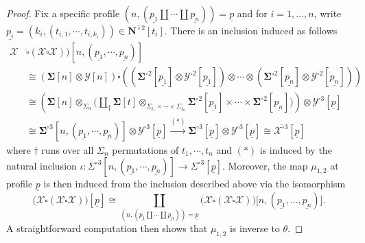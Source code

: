 \documentclass[11pt]{amsart}
\theoremstyle{definition}
\theoremstyle{remark}
\newcommand{\Cal}[1]{\mathcal{#1}}
\newcommand{\Ncirc}[1]{\mathbf{N}^{\hat{\circ}#1}}
\newcommand{\boxcirc}{\mathring{\square}}
\begin{document}
\begin{proof}
    Fix a specific profile $(n,(\underline{p_1}\amalg \cdots \amalg \underline{p_n}))=\underline{p}$ and for $i=1,\dots,n$, write $\underline{p_i}=(k_i, (t_{i,1},\cdots, t_{i,k_i})) \in \Ncirc{2}[t_i]$. There is an inclusion induced as follows \begin{align} 
         \Cal{X} &\boxcirc (\Cal{X} \boxcirc \Cal{X}) ) [n, (\underline{p_1},\cdots,\underline{p_n})] 
         \\
        & \cong (\mathbf{\Sigma}[n] \otimes  \Cal{Y}[n]) \square \left( \left( \mathbf{\Sigma}^{\circ 2}[\underline{p_1}] \otimes \Cal{Y}^{\square 2}[\underline{p_1}]\right)  \otimes \cdots \otimes \left( \mathbf{\Sigma}^{\circ 2}[\underline{p_n}] \otimes \Cal{Y}^{\square 2}[\underline{p_n}]\right) \right) \nonumber
        \\
        & \cong \left(\mathbf{\Sigma}[n] \otimes_{\Sigma_n} \Big(\coprod_{\dagger}\mathbf{\Sigma}[t] \otimes_{\Sigma_{t_1} \times \cdots \times \Sigma_{t_n}} \mathbf{\Sigma}^{\circ 2}[\underline{p_1}] \times \cdots \times \mathbf{\Sigma}^{\circ 2}[\underline{p_n}] \Big) \right) \otimes \Cal{Y}^{\square 3}[\underline{p}] \nonumber 
        \\ 
        & \cong \mathbf{\Sigma}^{\circ 3} [n, (\underline{p_1},\cdots, \underline{p_n})] \otimes \Cal{Y}^{\square 3}[\underline{p}] \xrightarrow{(*)} \mathbf{\Sigma}^{\circ 3}[\underline{p}] \otimes \Cal{Y}^{\square 3}[\underline{p}]  \cong \Cal{X}^{\boxcirc 3} [\underline{p}] \nonumber
    \end{align}
    where $\dagger$ runs over all $\Sigma_n$ permutations of $t_1,\cdots,t_n$ and $(*)$ is induced by the natural inclusion $\iota\colon \Sigma^{\circ 3} [n, (\underline{p_1},\cdots, \underline{p_n})] \to \Sigma^{\circ 3} [\underline{p}]$. Moreover, the map $\mu_{1,2}$ at profile $\underline{p}$ is then induced from the inclusion described above via the isomorphism\[
        \Big(\Cal{X}\boxcirc (\Cal{X} \boxcirc \Cal{X}) \Big)[\underline{p}] \cong \coprod_{(n,(\underline{p_1}\amalg \cdots \amalg \underline{p_n}))=\underline{p}} \Big(\Cal{X}\boxcirc (\Cal{X} \boxcirc \Cal{X}) \Big)\big [n,(\underline{p_1},\dots,\underline{p_n})\big].
    \]
    A straightforward computation then shows that $\mu_{1,2}$ is inverse to $\theta$.
    

\end{proof}
\end{document}
